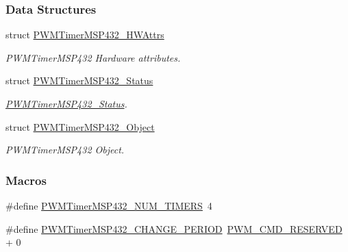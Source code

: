 \subsubsection*{Data Structures}
\begin{DoxyCompactItemize}
\item 
struct \hyperlink{struct_p_w_m_timer_m_s_p432___h_w_attrs}{P\+W\+M\+Timer\+M\+S\+P432\+\_\+\+H\+W\+Attrs}
\begin{DoxyCompactList}\small\item\em P\+W\+M\+Timer\+M\+S\+P432 Hardware attributes. \end{DoxyCompactList}\item 
struct \hyperlink{struct_p_w_m_timer_m_s_p432___status}{P\+W\+M\+Timer\+M\+S\+P432\+\_\+\+Status}
\begin{DoxyCompactList}\small\item\em \hyperlink{struct_p_w_m_timer_m_s_p432___status}{P\+W\+M\+Timer\+M\+S\+P432\+\_\+\+Status}. \end{DoxyCompactList}\item 
struct \hyperlink{struct_p_w_m_timer_m_s_p432___object}{P\+W\+M\+Timer\+M\+S\+P432\+\_\+\+Object}
\begin{DoxyCompactList}\small\item\em P\+W\+M\+Timer\+M\+S\+P432 Object. \end{DoxyCompactList}\end{DoxyCompactItemize}
\subsubsection*{Macros}
\begin{DoxyCompactItemize}
\item 
\#define \hyperlink{_p_w_m_timer_m_s_p432_8h_a763d487bae17c79c424242127b53518c}{P\+W\+M\+Timer\+M\+S\+P432\+\_\+\+N\+U\+M\+\_\+\+T\+I\+M\+E\+R\+S}~4
\item 
\#define \hyperlink{_p_w_m_timer_m_s_p432_8h_af4889b739a2240171923e90324ddf94b}{P\+W\+M\+Timer\+M\+S\+P432\+\_\+\+C\+H\+A\+N\+G\+E\+\_\+\+P\+E\+R\+I\+O\+D}~\hyperlink{_p_w_m_8h_ad731f4db58c72d280900da4be6e3434c}{P\+W\+M\+\_\+\+C\+M\+D\+\_\+\+R\+E\+S\+E\+R\+V\+E\+D} + 0
\end{DoxyCompactItemize}
